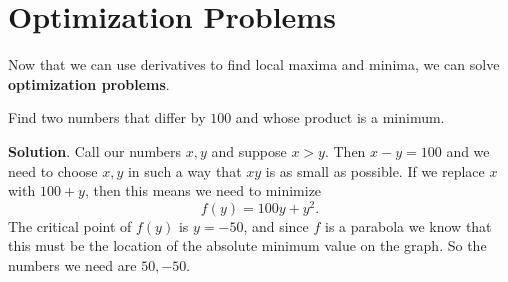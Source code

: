 \documentclass[10pt,]{book}
\newcommand{\terminology}[1]{\textbf{#1}}
\theoremstyle{ptxplainnotitle}
\theoremstyle{ptxplaintitle}
\theoremstyle{ptxplainnotitle}
\theoremstyle{ptxplaintitle}
\theoremstyle{ptxplainnotitle}
\theoremstyle{ptxplaintitle}
\theoremstyle{ptxdefinitionnotitle}
\theoremstyle{ptxdefinitiontitle}
\theoremstyle{ptxdefinitionnotitle}
\theoremstyle{ptxdefinitiontitle}
\theoremstyle{ptxdefinitionnotitle}
\theoremstyle{ptxdefinitiontitle}
\theoremstyle{ptxdefinitionnotitle}
\theoremstyle{ptxdefinitiontitle}
\theoremstyle{ptxdefinitionnotitle}
\theoremstyle{ptxdefinitiontitle}
\numberwithin{equation}{section}
\begin{document}
\section[{Optimization Problems}]{Optimization Problems}\label{section-optimization-problems}
\hypertarget{p-355}{}%
Now that we can use derivatives to find local maxima and minima, we can solve \terminology{optimization problems}.%
\begin{example}\label{example-minimizing-a-product}
\hypertarget{p-356}{}%
Find two numbers that differ by \(100\) and whose product is a minimum.%
\par\smallskip%
\noindent\textbf{Solution}.\hypertarget{solution-78}{}\quad%
\hypertarget{p-357}{}%
Call our numbers \(x,y\) and suppose \(x > y\). Then \(x-y = 100\) and we need to choose \(x,y\) in such a way that \(xy\) is as small as possible. If we replace \(x\) with \(100+y\), then this means we need to minimize%
\begin{equation*}
f(y) = 100y + y^{2}.
\end{equation*}
The critical point of \(f(y)\) is \(y = -50\), and since \(f\) is a parabola we know that this must be the location of the absolute minimum value on the graph. So the numbers we need are \(50,-50\).%
\end{example}
\end{document}
